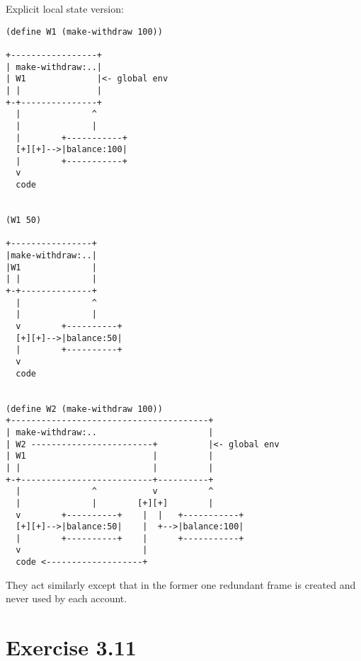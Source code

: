 \documentclass[../main.tex]{subfiles}
\begin{document}
Explicit local state version:

\begin{lstlisting}
(define W1 (make-withdraw 100))

+-----------------+
| make-withdraw:..|
| W1              |<- global env
| |               |
+-+---------------+
  |              ^
  |              |
  |        +-----------+
  [+][+]-->|balance:100|
  |        +-----------+
  v
  code


(W1 50)

+----------------+
|make-withdraw:..|
|W1              |
| |              |
+-+--------------+
  |              ^
  |              |
  v        +----------+
  [+][+]-->|balance:50|
  |        +----------+
  v
  code


(define W2 (make-withdraw 100))
+---------------------------------------+
| make-withdraw:..                      |
| W2 ------------------------+          |<- global env
| W1                         |          |
| |                          |          |
+-+--------------------------+----------+
  |              ^           v          ^
  |              |        [+][+]        |
  v        +----------+    |  |   +-----------+
  [+][+]-->|balance:50|    |  +-->|balance:100|
  |        +----------+    |      +-----------+
  v                        |
  code <-------------------+
\end{lstlisting}

They act similarly except that in the former one
 redundant frame is created and never used
 by each account.
 
\section{Exercise 3.11}
\end{document}
